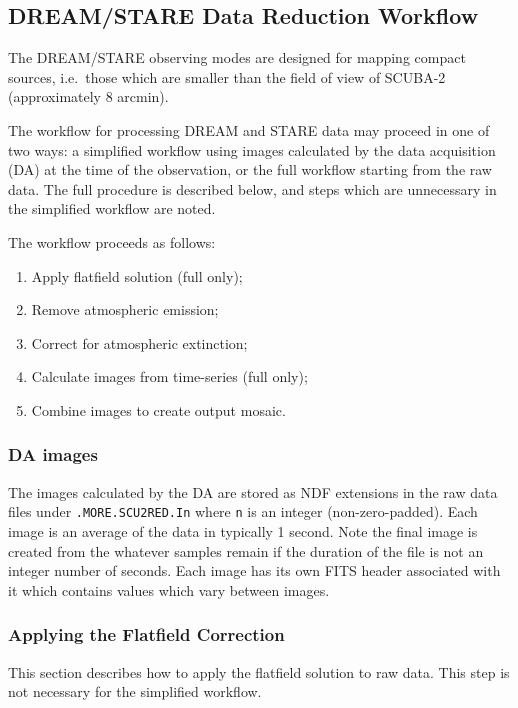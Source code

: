 \documentclass[twoside,11pt]{article}
\newcommand{\xlabel}[1]{}
\renewcommand{\_}{\texttt{\symbol{95}}}
\begin{document}
\subsection{\xlabel{dsworkflow}DREAM/STARE Data Reduction Workflow\label{se:dsworkflow}}

The DREAM/STARE observing modes are designed for mapping compact
sources, i.e.\ those which are smaller than the field of view of
SCUBA-2 (approximately 8 arcmin).

The workflow for processing DREAM and STARE data may proceed in one of
two ways: a simplified workflow using images calculated by the data
acquisition (DA) at the time of the observation, or the full workflow
starting from the raw data. The full procedure is described below, and
steps which are unnecessary in the simplified workflow are noted.

The workflow proceeds as follows:
\begin{enumerate}
\item Apply flatfield solution (full only);
\item Remove atmospheric emission;
\item Correct for atmospheric extinction;
\item Calculate images from time-series (full only);
\item Combine images to create output mosaic.
\end{enumerate}

\subsubsection{DA images}

The images calculated by the DA are stored as NDF extensions in the
raw data files under \texttt{.MORE.SCU2RED.In} where \texttt{n} is an
integer (non-zero-padded). Each image is an average of the data in
typically 1 second. Note the final image is created from the whatever
samples remain if the duration of the file is not an integer number of
seconds. Each image has its own FITS header associated with it which
contains values which vary between images.

\subsubsection{\xlabel{flatfield}Applying the Flatfield Correction\label{se:flatfield}}

This section describes how to apply the flatfield solution to raw
data. This step is not necessary for the simplified workflow.
\end{document}
